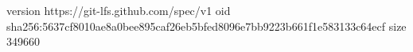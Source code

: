 version https://git-lfs.github.com/spec/v1
oid sha256:5637cf8010ae8a0bee895caf26eb5bfed8096e7bb9223b661f1e583133c64ecf
size 349660
